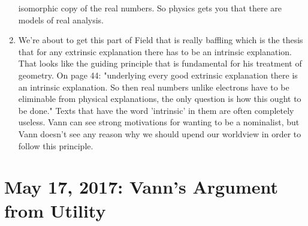 \documentclass[12pt]{article}
\theoremstyle{definition}
\begin{document}
\begin{enumerate}
        isomorphic copy of the real numbers. So physics gets you that there are
        models of real analysis.
    \item
        We're about to get this part of Field that is really baffling which is
        the thesis that for any extrinsic explanation there has to be an
        intrinsic explanation. That looks like the guiding principle that is
        fundamental for his treatment of geometry. On page 44: "underlying
        every good extrinsic explanation there is an intrinsic explanation. So
        then real numbers unlike electrons have to be eliminable from physical
        explanations, the only question is how this ought to be done." Texts
        that have the word 'intrinsic' in them are often completely useless.
        Vann can see strong motivations for wanting to be a nominalist, but
        Vann doesn't see any reason why we should upend our worldview in order
        to follow this principle.

\end{enumerate}

\section{May 17, 2017: Vann's Argument from Utility}
\end{document}
